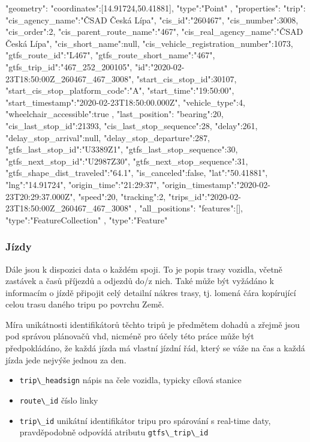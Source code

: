 \begin{code}[frame=none]
"geometry":{
  "coordinates":[14.91724,50.41881],
  "type":"Point"
},
"properties":{
  "trip":{
    "cis_agency_name":"ČSAD Česká Lípa",
	"cis_id":"260467",
	"cis_number":3008,
	"cis_order":2,
	"cis_parent_route_name":"467",
	"cis_real_agency_name":"ČSAD Česká Lípa",
	"cis_short_name":null,
	"cis_vehicle_registration_number":1073,
	"gtfs_route_id":"L467",
	"gtfs_route_short_name":"467",
	"gtfs_trip_id":"467_252_200105",
	"id":"2020-02-23T18:50:00Z_260467_467_3008",
	"start_cis_stop_id":30107,
	"start_cis_stop_platform_code":"A",
	"start_time":"19:50:00",
	"start_timestamp":"2020-02-23T18:50:00.000Z",
	"vehicle_type":4,
	"wheelchair_accessible":true
  },
  "last_position":{
    "bearing":20,
	"cis_last_stop_id":21393,
	"cis_last_stop_sequence":28,
	"delay":261,
	"delay_stop_arrival":null,
	"delay_stop_departure":287,
	"gtfs_last_stop_id":"U3389Z1",
	"gtfs_last_stop_sequence":30,
	"gtfs_next_stop_id":"U2987Z30",
	"gtfs_next_stop_sequence":31,
	"gtfs_shape_dist_traveled":"64.1",
	"is_canceled":false,
	"lat":"50.41881",
	"lng":"14.91724",
	"origin_time":"21:29:37",
	"origin_timestamp":"2020-02-23T20:29:37.000Z",
	"speed":20,
	"tracking":2,
	"trips_id":"2020-02-23T18:50:00Z_260467_467_3008"
	},
  "all_positions":{
    "features":[],
	"type":"FeatureCollection"
  }
},
"type":"Feature"

\end{code}

\subsubsection{Jízdy}

Dále jsou k dispozici data o každém spoji. To je popis trasy vozidla, včetně zastávek a časů příjezdů a odjezdů do/z nich. Také může být vyžádáno k informacím o jízdě připojit celý detailní nákres trasy, tj. lomená čára kopírující celou trasu daného tripu po povrchu Země.

\bigbreak

 Míra unikátnosti identifikátorů těchto tripů je předmětem dohadů a zřejmě jsou pod správou plánovačů \gls{vhd}, nicméně pro účely této práce může být předpokládáno, že každá jízda má vlastní jízdní řád, který se váže na čas a každá jízda jede nejvýše jednou za den.

\begin{itemize}
	\item \verb-trip\_headsign- nápis na čele vozidla, typicky cílová stanice

	\item \verb-route\_id- číslo linky

	\item \verb-trip\_id- unikátní identifikátor tripu pro spárování s real-time daty, pravděpodobně odpovídá atributu \verb"gtfs\_trip\_id"


\end{itemize}

